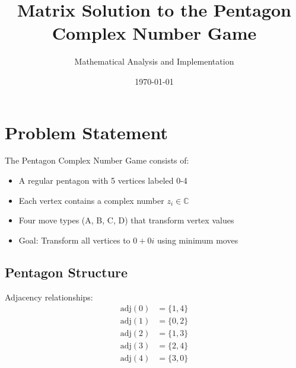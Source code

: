 \documentclass{article}
\title{Matrix Solution to the Pentagon Complex Number Game}
\author{Mathematical Analysis and Implementation}
\date{\today}
\begin{document}
\maketitle

\section{Problem Statement}

The Pentagon Complex Number Game consists of:
\begin{itemize}
    \item A regular pentagon with 5 vertices labeled 0-4
    \item Each vertex contains a complex number $z_i \in \mathbb{C}$
    \item Four move types (A, B, C, D) that transform vertex values
    \item Goal: Transform all vertices to $0 + 0i$ using minimum moves
\end{itemize}

\subsection{Pentagon Structure}

\begin{center}
\end{center}

Adjacency relationships:
\begin{align}
\text{adj}(0) &= \{1, 4\} \\
\text{adj}(1) &= \{0, 2\} \\
\text{adj}(2) &= \{1, 3\} \\
\text{adj}(3) &= \{2, 4\} \\
\text{adj}(4) &= \{3, 0\}
\end{align}
\end{document}
